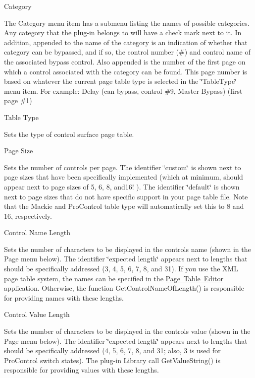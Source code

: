 \begin{DoxyItemize}
\item  Category 

The Category menu item has a submenu listing the names of possible categories. Any category that the plug-\/in belongs to will have a check mark next to it. In addition, appended to the name of the category is an indication of whether that category can be bypassed, and if so, the control number (\#) and control name of the associated bypass control. Also appended is the number of the first page on which a control associated with the category can be found. This page number is based on whatever the current page table type is selected in the \char`\"{}\+Table\+Type\char`\"{} menu item. For example\+: Delay (can bypass, control \#9, Master Bypass) (first page \#1)


\item  Table Type 

Sets the type of control surface page table.


\item  Page Size 

Sets the number of controls per page. The identifier \char`\"{}custom\char`\"{} is shown next to page sizes that have been specifically implemented (which at minimum, should appear next to page sizes of 5, 6, 8, and16! ). The identifier \char`\"{}default\char`\"{} is shown next to page sizes that do not have specific support in your page table file. Note that the Mackie and Pro\+Control table type will automatically set this to 8 and 16, respectively.


\item  Control Name Length 

Sets the number of characters to be displayed in the control\textquotesingle{}s name (shown in the Page menu below). The identifier \char`\"{}expected length\char`\"{} appears next to lengths that should be specifically addressed (3, 4, 5, 6, 7, 8, and 31). If you use the X\+ML page table system, the names can be specified in the \mbox{\hyperlink{a00833_subsection_creating_page_tables_in_pete}{Page Table Editor}} application. Otherwise, the function Get\+Control\+Name\+Of\+Length() is responsible for providing names with these lengths.


\item  Control Value Length 

Sets the number of characters to be displayed in the control\textquotesingle{}s value (shown in the Page menu below). The identifier \char`\"{}expected length\char`\"{} appears next to lengths that should be specifically addressed (4, 5, 6, 7, 8, and 31; also, 3 is used for Pro\+Control switch states). The plug-\/in Library call Get\+Value\+String() is responsible for providing values with these lengths.



\end{DoxyItemize}
